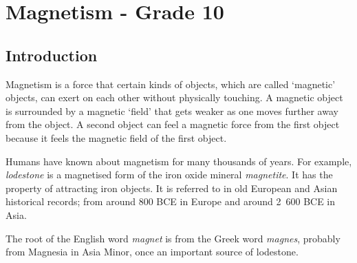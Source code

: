 



\chapter{Magnetism - Grade 10}
\label{p:em:m10}

\section{Introduction}
Magnetism is a force that certain kinds of objects, which are called `magnetic' objects, can exert on each other without physically touching. A magnetic object is surrounded by a magnetic `field' that gets weaker as one moves further away from the object. A second object can feel a magnetic force from the first object because it feels the magnetic field of the first object.


Humans have known about magnetism for many thousands of years.
For example, \textit{lodestone} is a magnetised form of the iron oxide mineral
\textit{magnetite}. It has the property of attracting iron
objects. It is referred to in old European and Asian historical
records; from around 800 \textsc{BCE} in Europe and around
2~600 \textsc{BCE} in Asia. 

\begin{IFact}{The root of the English word \textit{magnet} is from the Greek word \textit{magnes}, probably from Magnesia in Asia Minor, once an important source of lodestone.}
\end{IFact}


